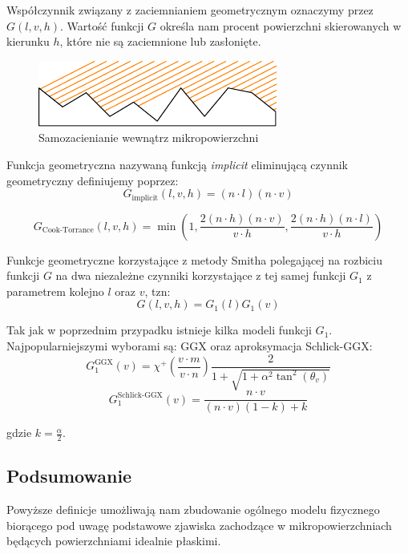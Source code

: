 \documentclass[../main.tex]{subfiles}
\begin{document}
Współczynnik związany z zaciemnianiem geometrycznym oznaczymy przez $G(l,v,h)$.
Wartość funkcji $G$ określa nam procent powierzchni skierowanych w kierunku
$h$, które nie są zaciemnione lub zasłonięte.

\begin{figure}[h]
  \centering
  \includegraphics{illustrations/pbr/geometry_shadowing.pdf}
  \vspace{0.25cm}
  \caption{Samozacienianie wewnątrz mikropowierzchni}
  \label{fig:GeometricShadowing}
\end{figure}

Funkcja geometryczna nazywaną funkcją \textit{implicit} eliminującą czynnik
geometryczny definiujemy poprzez:
\[
  G_{\text{implicit}}(l,v,h) =
    (n \cdot l) (n \cdot v)
\]

\[
  G_{\text{Cook-Torrance}}(l,v,h) =
    \min \left(
      1,
      \frac{2(n \cdot h)(n \cdot v)}{
        v \cdot h
      },
      \frac{2(n \cdot h)(n \cdot l)}{
        v \cdot h
      }
    \right)
\]

Funkcje geometryczne korzystające z metody Smitha polegającej na rozbiciu
funkcji $G$ na dwa niezależne czynniki korzystające z tej samej funkcji $G_1$
z parametrem kolejno $l$ oraz $v$, tzn:
\[
  G(l,v,h) = G_1(l) G_1(v)
\]

Tak jak w poprzednim przypadku istnieje kilka modeli funkcji $G_1$.
Najpopularniejszymi wyborami są: GGX oraz aproksymacja Schlick-GGX:
\[
  G_{1}^{\text{GGX}}(v) =
    \chi^{+}\left(\frac{v \cdot m}{v \cdot n}\right)
    \frac{2}{
      1 + \sqrt{
        1 + \alpha^2 \tan^{2}\left(\theta_v\right)
      }
    }
\]
\[
  G_{1}^{\text{Schlick-GGX}}(v) =
    \frac{n \cdot v}{
      (n \cdot v)(1 - k) + k
    }
\]

gdzie $k = \frac{\alpha}{2}$.

\subsection{Podsumowanie}

Powyższe definicje umożliwają nam zbudowanie ogólnego modelu fizycznego
biorącego pod uwagę podstawowe zjawiska zachodzące w mikropowierzchniach
będących powierzchniami idealnie płaskimi.
\end{document}
